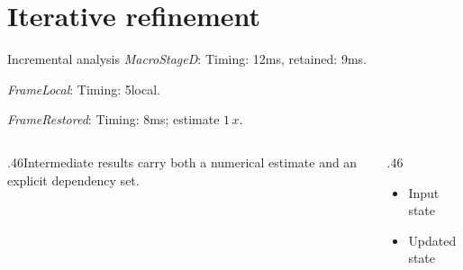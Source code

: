 \documentclass[11pt,aspectratio=43]{beamer}
\newcommand{\fuzzlayerA}[1]{\textit{#1}}
\newcommand{\fuzzlayerB}[1]{\fuzzlayerA{#1}}
\newcommand{\fuzzlayerC}[1]{\fuzzlayerB{#1}}
\newcommand{\fuzzterm}[1]{\fuzzlayerC{#1}}
\newcommand{\fuzzpair}[2]{\fuzzterm{#1}: #2}
\newcommand{\fuzzunit}{ms}
\let\fuzzoriginalunit\fuzzunit
\newcommand{\fuzzcoefficient}{1}
\newcommand{\fuzzscale}[2][\fuzzcoefficient]{#1\,#2}
\begin{document}
\section{Iterative refinement}
\begin{frame}[t]{Incremental analysis}
\fuzzpair{MacroStageD}{Timing: 12\fuzzunit, retained: 9\fuzzoriginalunit.}\par
{\renewcommand{\fuzzunit}{local}\fuzzpair{FrameLocal}{Timing: 5\fuzzunit.}\par}
\fuzzpair{FrameRestored}{Timing: 8\fuzzunit; estimate $\fuzzscale{x}$.}\par
\begin{columns}[T]\begin{column}{.46\textwidth}Intermediate results carry both a numerical estimate and an explicit dependency set.\end{column}\begin{column}{.46\textwidth}\begin{itemize}\item Input state\item Updated state\end{itemize}\end{column}\end{columns}
\end{frame}
\end{document}
